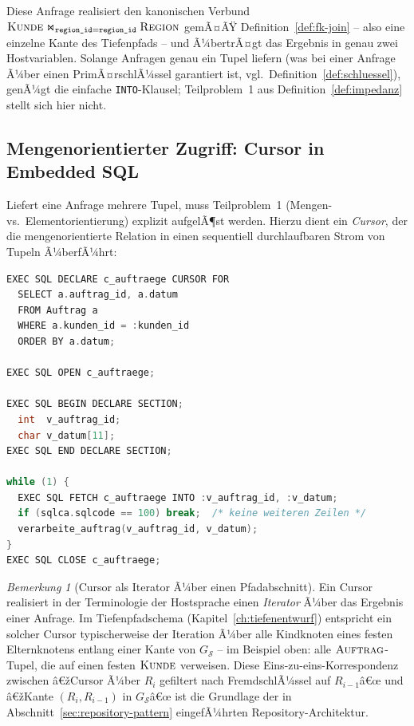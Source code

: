 ﻿\documentclass[a4paper,12pt]{report}
\theoremstyle{definition}
\theoremstyle{remark}
\newtheorem{remark}{Bemerkung}[chapter]
\begin{document}
Diese Anfrage realisiert den kanonischen Verbund
$\textsc{Kunde}\Join_{\texttt{region\_id}=\texttt{region\_id}}\textsc{Region}$
gemÃ¤ÃŸ Definition~\ref{def:fk-join} -- also eine einzelne Kante des
Tiefenpfads -- und Ã¼bertrÃ¤gt das Ergebnis in genau zwei Hostvariablen.
Solange Anfragen genau ein Tupel liefern (was bei einer Anfrage Ã¼ber
einen PrimÃ¤rschlÃ¼ssel garantiert ist, vgl.\
Definition~\ref{def:schluessel}), genÃ¼gt die einfache
\texttt{INTO}-Klausel; Teilproblem~1 aus
Definition~\ref{def:impedanz} stellt sich hier nicht.

\subsection{Mengenorientierter Zugriff: Cursor in Embedded SQL}
\label{sec:embedded-cursor}

Liefert eine Anfrage mehrere Tupel, muss Teilproblem~1
(Mengen- vs.\ Elementorientierung) explizit aufgelÃ¶st werden. Hierzu
dient ein \emph{Cursor}, der die mengenorientierte Relation in einen
sequentiell durchlaufbaren Strom von Tupeln Ã¼berfÃ¼hrt:

\begin{lstlisting}[language=C]
EXEC SQL DECLARE c_auftraege CURSOR FOR
  SELECT a.auftrag_id, a.datum
  FROM Auftrag a
  WHERE a.kunden_id = :kunden_id
  ORDER BY a.datum;

EXEC SQL OPEN c_auftraege;

EXEC SQL BEGIN DECLARE SECTION;
  int  v_auftrag_id;
  char v_datum[11];
EXEC SQL END DECLARE SECTION;

while (1) {
  EXEC SQL FETCH c_auftraege INTO :v_auftrag_id, :v_datum;
  if (sqlca.sqlcode == 100) break;  /* keine weiteren Zeilen */
  verarbeite_auftrag(v_auftrag_id, v_datum);
}
EXEC SQL CLOSE c_auftraege;
\end{lstlisting}

\begin{remark}[Cursor als Iterator Ã¼ber einen Pfadabschnitt]
\label{rem:cursor-iterator}
Ein Cursor realisiert in der Terminologie der Hostsprache einen
\emph{Iterator} Ã¼ber das Ergebnis einer Anfrage. Im Tiefenpfadschema
(Kapitel~\ref{ch:tiefenentwurf}) entspricht ein solcher Cursor
typischerweise der Iteration Ã¼ber alle Kindknoten eines festen
Elternknotens entlang einer Kante von $G_{\mathcal{S}}$ -- im Beispiel
oben: alle $\textsc{Auftrag}$-Tupel, die auf einen festen
$\textsc{Kunde}$ verweisen. Diese Eins-zu-eins-Korrespondenz zwischen
â€žCursor Ã¼ber $R_i$ gefiltert nach FremdschlÃ¼ssel auf $R_{i-1}$â€œ und
â€žKante $(R_i,R_{i-1})$ in $G_{\mathcal{S}}$â€œ ist die Grundlage der in
Abschnitt~\ref{sec:repository-pattern} eingefÃ¼hrten
Repository-Architektur.
\end{remark}
\end{document}
